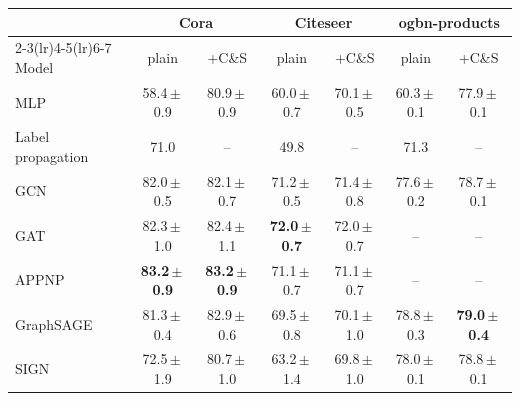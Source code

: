 \begin{tabular}{l cc cc cc}
\toprule
 & \multicolumn{2}{c}{Cora} & \multicolumn{2}{c}{Citeseer} & \multicolumn{2}{c}{ogbn-products} \\
\cmidrule(lr){2-3}\cmidrule(lr){4-5}\cmidrule(lr){6-7}
Model & plain & +C\&S & plain & +C\&S & plain & +C\&S \\
\midrule
MLP & 58.4\,$\pm$\,0.9 & 80.9\,$\pm$\,0.9 & 60.0\,$\pm$\,0.7 & 70.1\,$\pm$\,0.5 & 60.3\,$\pm$\,0.1 & 77.9\,$\pm$\,0.1 \\
Label propagation & 71.0 & -- & 49.8 & -- & 71.3 & -- \\
GCN & 82.0\,$\pm$\,0.5 & 82.1\,$\pm$\,0.7 & 71.2\,$\pm$\,0.5 & 71.4\,$\pm$\,0.8 & 77.6\,$\pm$\,0.2 & 78.7\,$\pm$\,0.1 \\
GAT & 82.3\,$\pm$\,1.0 & 82.4\,$\pm$\,1.1 & \textbf{72.0\,$\pm$\,0.7} & 72.0\,$\pm$\,0.7 & -- & -- \\
APPNP & \textbf{83.2\,$\pm$\,0.9} & \textbf{83.2\,$\pm$\,0.9} & 71.1\,$\pm$\,0.7 & 71.1\,$\pm$\,0.7 & -- & -- \\
GraphSAGE & 81.3\,$\pm$\,0.4 & 82.9\,$\pm$\,0.6 & 69.5\,$\pm$\,0.8 & 70.1\,$\pm$\,1.0 & 78.8\,$\pm$\,0.3 & \textbf{79.0\,$\pm$\,0.4} \\
SIGN & 72.5\,$\pm$\,1.9 & 80.7\,$\pm$\,1.0 & 63.2\,$\pm$\,1.4 & 69.8\,$\pm$\,1.0 & 78.0\,$\pm$\,0.1 & 78.8\,$\pm$\,0.1 \\
\bottomrule
\end{tabular}
